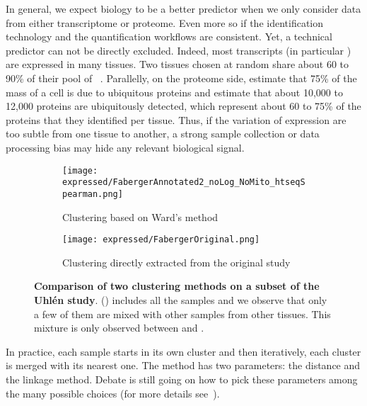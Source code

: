 In general, we expect biology to be a better predictor when we only consider
data from either transcriptome or proteome. Even more so if the
identification technology and the quantification workflows are
consistent. Yet, a technical predictor can not be directly excluded.
Indeed, most transcripts (in particular \mRNAs) are expressed in many tissues.
Two tissues chosen at random share about 60 to 90\% of their pool of
\mRNAs~.
Parallelly, on the proteome side, \citet{PandeyData}
estimate that 75\% of the mass of a cell is due to ubiquitous proteins and
\citet{KusterData} estimate that about 10,000
to 12,000 proteins are ubiquitously detected, which represent about 60 to 75\%
of the proteins that they identified per tissue. Thus, if the variation of
expression are too subtle from one tissue to another, a strong sample collection
or data processing bias may hide any relevant biological signal.\mybr\

\begin{figure}[!htpb]
    \centering
       \begin{subfigure}[hp]{0.70\textwidth}
       \centering \texttt{[image: expressed/FabergerAnnotated2\_noLog\_NoMito\_htseqSpearman.png]}
    \caption{Clustering based on Ward's method}\label{fig:FabergerRedone}
   \end{subfigure}

     \begin{subfigure}[hp]{0.70\textwidth}
      \centering \texttt{[image: expressed/FabergerOriginal.png]}
      \caption{Clustering directly extracted from the original study
      {\footnotesize {}}}\label{fig:fabergerOriginal}
       \end{subfigure}
    \caption[Comparison of two clustering methods on a subset of the \uhlen\ study]{%
    \textbf{Comparison of two clustering methods on a subset of the Uhlén study}.
    () includes all the samples and
    we observe that only a few of them are mixed with other samples from other tissues.
    This mixture is only observed between  and .
 }\label{fig:versusFaberger}
\end{figure}

In practice, each sample starts in its own cluster and then
iteratively, each cluster is merged with its nearest one.
The method has two parameters: the distance and the linkage method.
Debate is still going on how to pick these parameters among the many possible
choices (for more details see~).\mybr\

